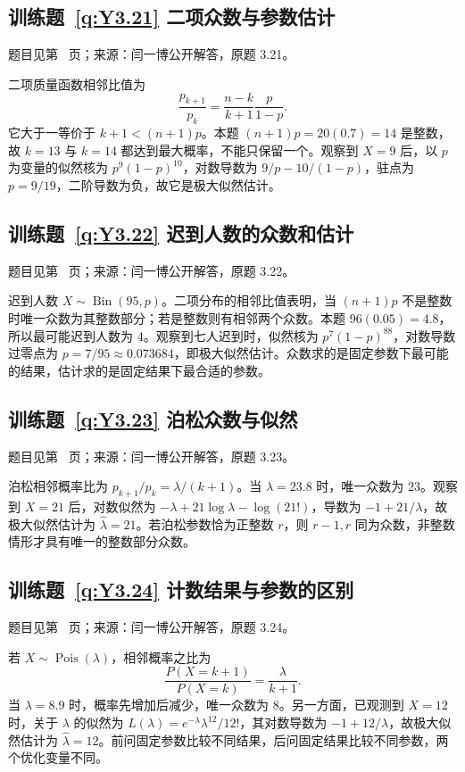 \documentclass[UTF8,12pt,a4paper,fontset=fandol]{ctexbook}
\begin{document}
\subsection*{训练题~\ref{q:Y3.21} 二项众数与参数估计}\label{a:Y3.21}{\small 题目见第~\pageref{q:Y3.21} 页；来源：闫一博公开解答，原题 3.21。}
\begin{solve}二项质量函数相邻比值为\[\frac{p_{k+1}}{p_k}=\frac{n-k}{k+1}\frac{p}{1-p}.\]它大于一等价于 $k+1<(n+1)p$。本题 $(n+1)p=20(0.7)=14$ 是整数，故 $k=13$ 与 $k=14$ 都达到最大概率，不能只保留一个。观察到 $X=9$ 后，以 $p$ 为变量的似然核为 $p^9(1-p)^{10}$，对数导数为 $9/p-10/(1-p)$，驻点为 $p=9/19$，二阶导数为负，故它是极大似然估计。\end{solve}

\subsection*{训练题~\ref{q:Y3.22} 迟到人数的众数和估计}\label{a:Y3.22}{\small 题目见第~\pageref{q:Y3.22} 页；来源：闫一博公开解答，原题 3.22。}
\begin{solve}迟到人数 $X\sim\operatorname{Bin}(95,p)$。二项分布的相邻比值表明，当 $(n+1)p$ 不是整数时唯一众数为其整数部分；若是整数则有相邻两个众数。本题 $96(0.05)=4.8$，所以最可能迟到人数为 $4$。观察到七人迟到时，似然核为 $p^7(1-p)^{88}$，对数导数过零点为 $p=7/95\approx0.073684$，即极大似然估计。众数求的是固定参数下最可能的结果，估计求的是固定结果下最合适的参数。\end{solve}

\subsection*{训练题~\ref{q:Y3.23} 泊松众数与似然}\label{a:Y3.23}{\small 题目见第~\pageref{q:Y3.23} 页；来源：闫一博公开解答，原题 3.23。}
\begin{solve}泊松相邻概率比为 $p_{k+1}/p_k=\lambda/(k+1)$。当 $\lambda=23.8$ 时，唯一众数为 $23$。观察到 $X=21$ 后，对数似然为 $-\lambda+21\log\lambda-\log(21!)$，导数为 $-1+21/\lambda$，故极大似然估计为 $\widehat\lambda=21$。若泊松参数恰为正整数 $r$，则 $r-1,r$ 同为众数，非整数情形才具有唯一的整数部分众数。\end{solve}

\subsection*{训练题~\ref{q:Y3.24} 计数结果与参数的区别}\label{a:Y3.24}{\small 题目见第~\pageref{q:Y3.24} 页；来源：闫一博公开解答，原题 3.24。}
\begin{solve}若 $X\sim\operatorname{Pois}(\lambda)$，相邻概率之比为\[\frac{P(X=k+1)}{P(X=k)}=\frac{\lambda}{k+1}.\]当 $\lambda=8.9$ 时，概率先增加后减少，唯一众数为 $8$。另一方面，已观测到 $X=12$ 时，关于 $\lambda$ 的似然为 $L(\lambda)=e^{-\lambda}\lambda^{12}/12!$，其对数导数为 $-1+12/\lambda$，故极大似然估计为 $\widehat\lambda=12$。前问固定参数比较不同结果，后问固定结果比较不同参数，两个优化变量不同。\end{solve}
\end{document}
